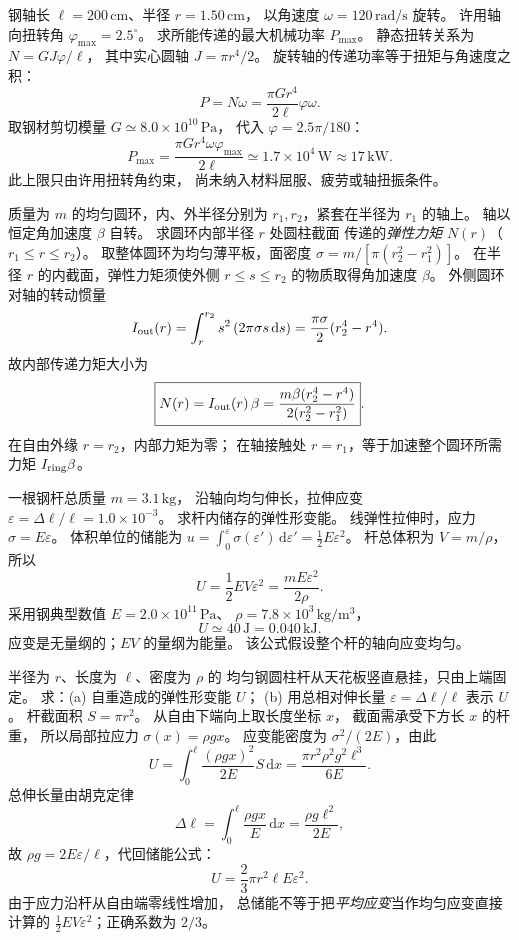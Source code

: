 钢轴长 $\ell=200\,\mathrm{cm}$、半径
$r=1.50\,\mathrm{cm}$，
以角速度 $\omega=120\,\mathrm{rad/s}$ 旋转。
许用轴向扭转角 $\varphi_{\max}=2.5^\circ$。
求所能传递的最大机械功率 $P_{\max}$。
\exsolution
静态扭转关系为
$N=GJ\varphi/\ell$，
其中实心圆轴 $J=\pi r^4/2$。
旋转轴的传递功率等于扭矩与角速度之积：
\[
P=N\omega
=\frac{\pi G r^4}{2\ell}\varphi\omega.
\]
取钢材剪切模量
$G\simeq8.0\times10^{10}\,\mathrm{Pa}$，
代入 $\varphi=2.5\pi/180$：
\[
\boxed{P_{\max}=
\frac{\pi G r^4\omega\varphi_{\max}}{2\ell}
\simeq1.7\times10^4\,\mathrm W\approx17\,\mathrm{kW}}.
\]
\excheck 此上限只由许用扭转角约束，
尚未纳入材料屈服、疲劳或轴扭振条件。

质量为 $m$ 的均匀圆环，内、外半径分别为
$r_1,r_2$，紧套在半径为 $r_1$ 的轴上。
轴以恒定角加速度 $\beta$ 自转。
求圆环内部半径 $r$ 处圆柱截面
传递的\emph{弹性力矩} $N(r)$（$r_1\le r\le r_2$）。
\exsolution
取整体圆环为均匀薄平板，面密度
$\sigma=m/[\pi(r_2^2-r_1^2)]$。
在半径 $r$ 的内截面，弹性力矩须使外侧
$r\le s\le r_2$ 的物质取得角加速度 $\beta$。
外侧圆环对轴的转动惯量
\[
I_{\rm out}(r)=\int_r^{r_2}s^2\,(2\pi\sigma s\,\mathrm ds)
=\frac{\pi\sigma}{2}(r_2^4-r^4).
\]
故内部传递力矩大小为
\[
\boxed{N(r)=I_{\rm out}(r)\,\beta
=\frac{m\beta(r_2^4-r^4)}{2(r_2^2-r_1^2)}}.
\]
\excheck 在自由外缘 $r=r_2$，内部力矩为零；
在轴接触处 $r=r_1$，等于加速整个圆环所需力矩
$I_{\rm ring}\beta$。

一根钢杆总质量 $m=3.1\,\mathrm{kg}$，
沿轴向均匀伸长，拉伸应变
$\varepsilon=\Delta\ell/\ell=1.0\times10^{-3}$。
求杆内储存的弹性形变能。
\exsolution
线弹性拉伸时，应力
$\sigma=E\varepsilon$。
体积单位的储能为
$u=\int_0^\varepsilon\sigma(\varepsilon')
\,\mathrm d\varepsilon'
=\tfrac12E\varepsilon^2$。
杆总体积为 $V=m/\rho$，
所以
\[
\boxed{U=\frac12EV\varepsilon^2
=\frac{mE\varepsilon^2}{2\rho}}.
\]
采用钢典型数值
$E=2.0\times10^{11}\,\mathrm{Pa}$、
$\rho=7.8\times10^3\,\mathrm{kg/m^3}$，
\[
\boxed{U\simeq40\,\mathrm J
=0.040\,\mathrm{kJ}}.
\]
\excheck 应变是无量纲的；$EV$ 的量纲为能量。
该公式假设整个杆的轴向应变均匀。

半径为 $r$、长度为 $\ell$、密度为 $\rho$ 的
均匀钢圆柱杆从天花板竖直悬挂，只由上端固定。
求：(a) 自重造成的弹性形变能 $U$；
(b) 用总相对伸长量
$\varepsilon=\Delta\ell/\ell$ 表示 $U$。
\exsolution
杆截面积 $S=\pi r^2$。
从自由下端向上取长度坐标 $x$，
截面需承受下方长 $x$ 的杆重，
所以局部拉应力 $\sigma(x)=\rho gx$。
应变能密度为 $\sigma^2/(2E)$，由此
\[
U=\int_0^\ell
\frac{(\rho gx)^2}{2E}S\,\mathrm dx
=\boxed{\frac{\pi r^2\rho^2g^2\ell^3}{6E}}.
\]
总伸长量由胡克定律
\[
\Delta\ell=\int_0^\ell\frac{\rho gx}{E}\,\mathrm dx
=\frac{\rho g\ell^2}{2E},
\]
故 $\rho g=2E\varepsilon/\ell$，代回储能公式：
\[
\boxed{U=\frac23\pi r^2\ell E\varepsilon^2}.
\]
\excheck 由于应力沿杆从自由端零线性增加，
总储能不等于把\emph{平均应变}当作均匀应变直接计算的
$\frac12E V\varepsilon^2$；正确系数为 $2/3$。
